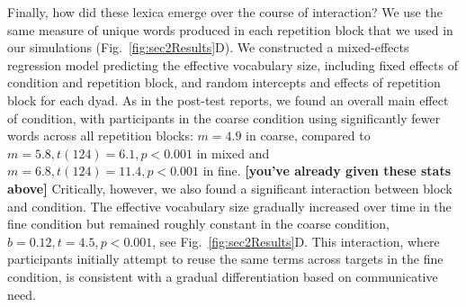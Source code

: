 Finally, how did these lexica emerge over the course of interaction? 
We use the same measure of unique words produced in each repetition block that we used in our simulations (Fig.~\ref{fig:sec2Results}D). 
We constructed a mixed-effects regression model predicting the effective vocabulary size, including fixed effects of condition and repetition block, and random intercepts and effects of repetition block for each dyad. 
As in the post-test reports, we found an overall main effect of condition, with participants in the coarse condition using significantly fewer words across all repetition blocks: $m = 4.9$ in coarse, compared to $m=5.8, t(124)=6.1, p <0.001$ in mixed and $m=6.8, t(124) =11.4, p < 0.001$ in fine.
\textbf{[you've already given these stats above]}
Critically, however, we also found a significant interaction between block and condition. 
The effective vocabulary size gradually increased over time in the fine condition but remained roughly constant in the coarse condition, $b = 0.12, t = 4.5, p < 0.001$, see Fig.~\ref{fig:sec2Results}D.
This interaction, where participants initially attempt to reuse the same terms across targets in the fine condition, is consistent with a gradual differentiation based on communicative need.



%

